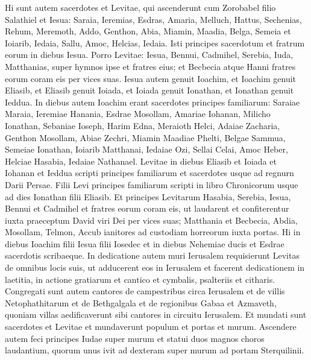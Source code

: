 \begin{biblechapter}
\begin{biblechapter}
\begin{biblechapter}
\begin{biblechapter}
\begin{biblechapter}
\begin{biblechapter}
\begin{biblechapter}
\begin{biblechapter}
\begin{biblechapter}
\begin{biblechapter}
\begin{biblechapter}
\begin{biblechapter}
\verse Hi sunt autem sacerdotes et Levitae, qui ascenderunt cum Zorobabel filio Salathiel et Iesua: Saraia, Ieremias, Esdras, 
\verse Amaria, Melluch, Hattus, 
 \verse Sechenias, Rehum, Meremoth, 
\verse Addo, Genthon, Abia, 
\verse Miamin, Maadia, Belga, 
\verse Semeia et Ioiarib, Iedaia, 
\verse Sallu, Amoc, Helcias, Iedaia. Isti principes sacerdotum et fratrum eorum in diebus Iesua.
 \verse Porro Levitae: Iesua, Bennui, Cadmihel, Serebia, Iuda, Matthanias, super hymnos ipse et fratres eius; 
\verse et Becbecia atque Hanni fratres eorum coram eis per vices suas. 
\verse Iesua autem genuit Ioachim, et Ioachim genuit Eliasib, et Eliasib genuit Ioiada, 
\verse et Ioiada genuit Ionathan, et Ionathan genuit Ieddua.
 \verse In diebus autem Ioachim erant sacerdotes principes familiarum: Saraiae Maraia, Ieremiae Hanania, 
\verse Esdrae Mosollam, Amariae Iohanan, 
\verse Milicho Ionathan, Sebaniae Ioseph, 
\verse Harim Edna, Meraioth Helci, 
\verse Adaiae Zacharia, Genthon Mosollam, 
\verse Abiae Zechri, Miamin Maadiae Phelti, 
 \verse Belgae Sammua, Semeiae Ionathan, 
\verse Ioiarib Matthanai, Iedaiae Ozi, 
 \verse Sellai Celai, Amoc Heber, 
\verse Helciae Hasabia, Iedaiae Nathanael.
 \verse Levitae in diebus Eliasib et Ioiada et Iohanan et Ieddua scripti principes familiarum et sacerdotes usque ad regnurn Darii Persae. 
\verse Filii Levi principes familiarum scripti in libro Chronicorum usque ad dies Ionathan filii Eliasib.
 \verse Et principes Levitarum Hasabia, Serebia, Iesua, Bennui et Cadmihel et fratres eorum coram eis, ut laudarent et confiterentur iuxta praeceptum David viri Dei per vices suas; 
\verse Matthania et Becbecia, Abdia, Mosollam, Telmon, Accub ianitores ad custodiam horreorum iuxta portas. 
\verse Hi in diebus Ioachim filii Iesua filii Iosedec et in diebus Nehemiae ducis et Esdrae sacerdotis scribaeque.
 \verse In dedicatione autem muri Ierusalem requisierunt Levitas de omnibus locis suis, ut adducerent eos in Ierusalem et facerent dedicationem in laetitia, in actione gratiarum et cantico et cymbalis, psalteriis et citharis. 
\verse Congregati sunt autem cantores de campestribus circa Ierusalem et de villis Netophathitarum \verse et de Bethgalgala et de regionibus Gabaa et Azmaveth, quoniam villas aedificaverunt sibi cantores in circuitu Ierusalem.
 \verse Et mundati sunt sacerdotes et Levitae et mundaverunt populum et portas et murum. 
\verse Ascendere autem feci principes Iudae super murum et statui duos magnos choros laudantium, quorum unus ivit ad dexteram super murum ad portam Sterquilinii. 

\end{biblechapter}
\end{biblechapter}
\end{biblechapter}
\end{biblechapter}
\end{biblechapter}
\end{biblechapter}
\end{biblechapter}
\end{biblechapter}
\end{biblechapter}
\end{biblechapter}
\end{biblechapter}
\end{biblechapter}
